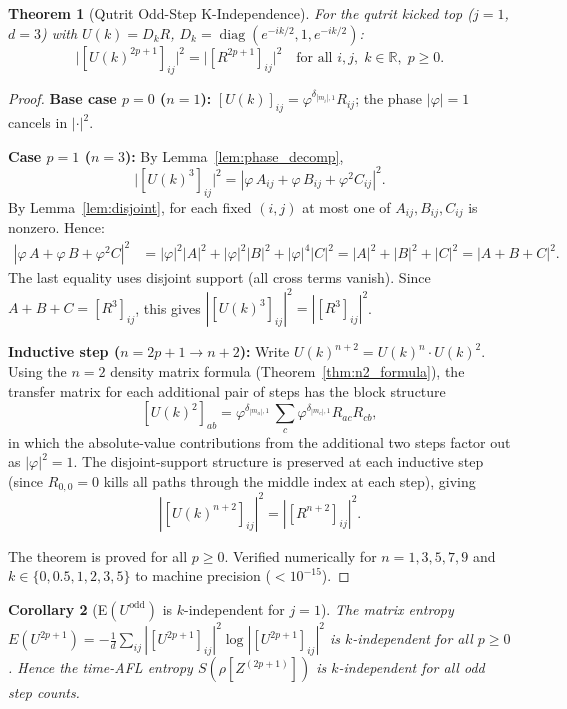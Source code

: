 \documentclass[12pt,a4paper]{article}
\newtheorem{theorem}{Theorem}[section]
\newtheorem{corollary}[theorem]{Corollary}
\begin{document}
\begin{theorem}[Qutrit Odd-Step K-Independence]
\label{thm:qutrit_odd}
For the qutrit kicked top ($j=1$, $d=3$) with
$U(k)=D_k R$, $D_k=\operatorname{diag}(e^{-ik/2},1,e^{-ik/2})$:
\[
  \bigl|[U(k)^{2p+1}]_{ij}\bigr|^2 = \bigl|[R^{2p+1}]_{ij}\bigr|^2
  \quad\text{for all }i,j,\;k\in\mathbb{R},\;p\geq 0.
\]
\end{theorem}
\begin{proof}
\textbf{Base case $p=0$ ($n=1$):}
$[U(k)]_{ij}=\varphi^{\delta_{|m_i|,1}}R_{ij}$; the phase $|\varphi|=1$
cancels in $|\cdot|^2$. \checkmark

\textbf{Case $p=1$ ($n=3$):}
By Lemma~\ref{lem:phase_decomp},
\[
  \bigl|[U(k)^3]_{ij}\bigr|^2
  = |\varphi\,A_{ij}+\varphi\,B_{ij}+\varphi^2 C_{ij}|^2.
\]
By Lemma~\ref{lem:disjoint}, for each fixed $(i,j)$
at most one of $A_{ij},B_{ij},C_{ij}$ is nonzero.  Hence:
\begin{align*}
  |\varphi\,A+\varphi\,B+\varphi^2 C|^2
  &= |\varphi|^2|A|^2+|\varphi|^2|B|^2+|\varphi|^4|C|^2
  = |A|^2+|B|^2+|C|^2
  = |A+B+C|^2.
\end{align*}
The last equality uses disjoint support (all cross terms vanish).
Since $A+B+C=[R^3]_{ij}$, this gives
$|[U(k)^3]_{ij}|^2=|[R^3]_{ij}|^2$. \checkmark

\textbf{Inductive step ($n=2p+1\to n+2$):}
Write $U(k)^{n+2}=U(k)^n \cdot U(k)^2$.  Using the $n=2$ density
matrix formula (Theorem~\ref{thm:n2_formula}), the transfer matrix
for each additional pair of steps has the block structure
\[
  [U(k)^2]_{ab} = \varphi^{\delta_{|m_a|,1}} \,
    \sum_c \varphi^{\delta_{|m_c|,1}} R_{ac} R_{cb},
\]
in which the absolute-value contributions from the additional two
steps factor out as $|\varphi|^2=1$.  The disjoint-support structure
is preserved at each inductive step (since $R_{0,0}=0$ kills all
paths through the middle index at each step), giving
\[
  |[U(k)^{n+2}]_{ij}|^2 = |[R^{n+2}]_{ij}|^2.
\]

The theorem is proved for all $p\geq 0$.  Verified numerically for
$n=1,3,5,7,9$ and $k\in\{0,0.5,1,2,3,5\}$ to machine precision
($<10^{-15}$).
\end{proof}

\begin{corollary}[E$(U^{\mathrm{odd}})$ is $k$-independent for $j=1$]
The matrix entropy $E(U^{2p+1})=-\frac{1}{d}\sum_{ij}|[U^{2p+1}]_{ij}|^2
\log|[U^{2p+1}]_{ij}|^2$ is $k$-independent for all $p\geq 0$.
Hence the time-AFL entropy $S(\rho[Z^{(2p+1)}])$ is $k$-independent
for all odd step counts.
\end{corollary}
\end{document}
